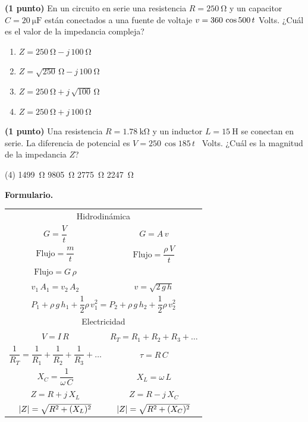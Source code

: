 \documentclass[12pt, letter]{exam}
\begin{document}
\begin{questions}
    \newpage

    \question \textbf{(1 punto)} En un circuito en serie una resistencia $R = \SI{250}{\ohm}$ y un capacitor $C = \SI{20}{\micro\farad}$ están conectados a una fuente de voltaje $v = \num 360 \, \cos 500 \, t$ Volts. ¿Cuál es el valor de la impedancia compleja?
    \begin{multicols}{2}
        \begin{enumerate}[label=\Alph*)]
            \item $Z = \SI{250}{\ohm} - j \, \SI{100}{\ohm}$
            \item $Z = \sqrt{250} \, \si{\ohm} - j \, \SI{100}{\ohm}$
            \item $Z = \SI{250}{\ohm} + j \, \sqrt{100} \, \si{\ohm}$
            \item $Z = \SI{250}{\ohm} + j \, \SI{100}{\ohm}$
        \end{enumerate}
    \end{multicols}
    \question \textbf{(1 punto)} Una resistencia $R = \SI{1.78}{\kilo\ohm}$ y un inductor $L = \SI{15}{\henry}$ se conectan en serie. La diferencia de potencial es $V = \num{250} \, \cos 185 \, t$ \, Volts. ¿Cuál es la magnitud de la impedancia $Z$?
    \begin{tasks}(4)
        \task \SI{1499}{\ohm}
        \task \SI{9805}{\ohm}
        \task \SI{2775}{\ohm}
        \task \SI{2247}{\ohm}
    \end{tasks}

\end{questions}

\textbf{\huge{Formulario.}}
\begin{table}[H]
    \centering
    \setlength{\tabcolsep}{40pt}
    \renewcommand{\arraystretch}{2.5}
    \begin{tabular}{c  c}
        \multicolumn{2}{c}{Hidrodinámica} \\
        $G = \dfrac{V}{t}$ & $G = A \, v$ \\
        $\text{Flujo} = \dfrac{m}{t}$ & $\text{Flujo} = \dfrac{\rho \, V}{t}$ \\
        $\text{Flujo} = G \, \rho$ & \\
        $v_{1} \, A_{1} = v_{2} \, A_{2}$ & $v = \sqrt{2 \, g \, h}$ \\
        \multicolumn{2}{c}{$P_{1} + \rho \, g \, h_{1} + \dfrac{1}{2} \rho \, v_{1}^{2} = P_{2} + \rho \, g \, h_{2} + \dfrac{1}{2} \rho \, v_{2}^{2}$} \\ \hline
        \multicolumn{2}{c}{Electricidad} \\
        $V = I \, R$ & $R_{T} = R_{1} + R_{2} + R_{3} + \ldots$ \\
        $\dfrac{1}{R_{T}} = \dfrac{1}{R_{1}} + \dfrac{1}{R_{2}} + \dfrac{1}{R_{3}} + \ldots$ & $\tau = R \, C$ \\
        $X_{C} = \dfrac{1}{\omega \, C}$ & $X_{L} = \omega\, L$ \\
        $Z = R + j \, X_{L}$ & $Z = R - j \, X_{C}$ \\
        $\abs{Z} = \sqrt{R^{2} + (X_{L})^{2}}$ & $\abs{Z} = \sqrt{R^{2} + (X_{C})^{2}}$ \\
\end{tabular}
\end{table}
\end{document}
